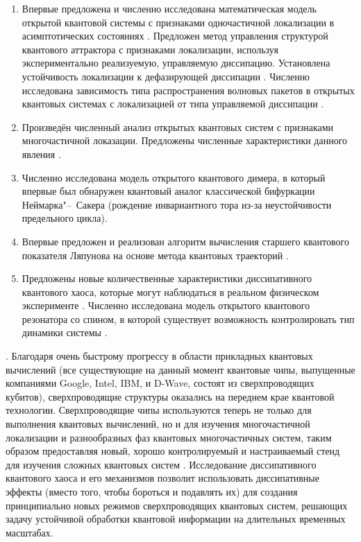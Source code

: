 {\novelty}
\begin{enumerate}[beginpenalty=10000] %
	\item Впервые предложена и численно исследована математическая модель открытой квантовой системы с признаками одночастичной локализации в асимптотических состояниях \cite{Yusipov2017}. 
	Предложен метод управления структурой квантового аттрактора с признаками локализации, используя экспериментально реализуемую, управляемую диссипацию. 
	Установлена устойчивость локализации к дефазирующей диссипации \cite{Vershinina2017}.
	Численно исследована зависимость типа распространения волновых пакетов в открытых квантовых системах с локализацией от типа управляемой диссипации \cite{Yusipov2018}.
	\item Произведён численный анализ открытых квантовых систем с признаками многочастичной локазации. Предложены численные характеристики данного явления \cite{Vakulchyk2018}.
	\item Численно исследована модель открытого квантового димера, в который впервые был обнаружен квантовый аналог классической бифуркации Неймарка"--~Сакера \cite{Yusipov2019_1} (рождение инвариантного тора из-за неустойчивости предельного цикла).
	\item Впервые предложен и реализован алгоритм вычисления старшего квантового показателя Ляпунова на основе метода квантовых траекторий \cite{Yusipov2019_2}.
	\item Предложены новые количественные характеристики диссипативного квантового хаоса, которые могут наблюдаться в реальном физическом эксперименте \cite{Yusipov2020}. Численно исследована модель открытого квантового резонатора со спином, в которой существует возможность контролировать тип динамики системы \cite{Yusipov2021}.
\end{enumerate}

{\influence}. Благодаря очень быстрому прогрессу в области прикладных квантовых вычислений (все существующие на данный момент квантовые чипы, выпущенные компаниями Google, Intel, IBM, и D-Wave, состоят из сверхпроводящих кубитов), сверхпроводящие структуры оказались на переднем крае квантовой технологии. 
Сверхпроводящие чипы используются теперь не только для выполнения квантовых вычислений, но и для изучения многочастичной локализации \autocite{Roushan2017} и разнообразных фаз квантовых многочастичных систем, таким образом предоставляя новый, хорошо контролируемый и настраиваемый стенд для изучения сложных квантовых систем \autocite{Barends2015}. 
Исследование диссипативного квантового хаоса и его механизмов позволит использовать диссипативные эффекты (вместо того, чтобы бороться и подавлять их) для создания принципиально новых режимов сверхпроводящих квантовых систем, решающих задачу устойчивой обработки квантовой информации на длительных временных масштабах.

